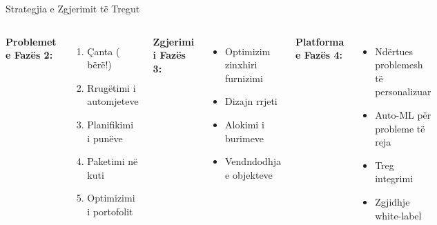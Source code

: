 \documentclass[aspectratio=169]{beamer}
\newcommand{\checkmark}{\ding{51}}
\begin{document}
\begin{frame}{Strategjia e Zgjerimit të Tregut}
\begin{columns}
\textbf{Problemet e Fazës 2:}
\begin{enumerate}
    \item Çanta (\checkmark{} bërë!)
    \item Rrugëtimi i automjeteve
    \item Planifikimi i punëve
    \item Paketimi në kuti
    \item Optimizimi i portofolit
\end{enumerate}

\vspace{0.3cm}
\textbf{Zgjerimi i Fazës 3:}
\begin{itemize}
    \item Optimizim zinxhiri furnizimi
    \item Dizajn rrjeti
    \item Alokimi i burimeve
    \item Vendndodhja e objekteve
\end{itemize}

\textbf{Platforma e Fazës 4:}
\begin{itemize}
    \item Ndërtues problemesh të personalizuar
    \item Auto-ML për probleme të reja
    \item Treg integrimi
    \item Zgjidhje white-label
\end{itemize}

\vspace{0.3cm}
\begin{center}
\end{center}
\end{columns}
\end{frame}

\end{document}
